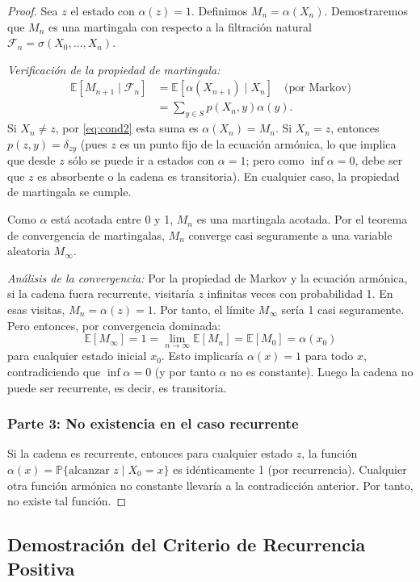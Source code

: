 \documentclass[11pt,a4paper]{article}
\theoremstyle{plain}
\theoremstyle{definition}
\theoremstyle{remark}
\newcommand{\1}{\mathds{1}}
\begin{document}
\begin{proof}
Sea \(z\) el estado con \(\alpha(z) = 1\). Definimos \(M_n = \alpha(X_n)\). Demostraremos que \(M_n\) es una martingala con respecto a la filtración natural \(\mathcal{F}_n = \sigma(X_0, \ldots, X_n)\).

\emph{Verificación de la propiedad de martingala:}
\[
\begin{aligned}
\mathbb{E}[M_{n+1} \mid \mathcal{F}_n] &= \mathbb{E}[\alpha(X_{n+1}) \mid X_n] \quad \text{(por Markov)} \\
&= \sum_{y\in S} p(X_n, y) \alpha(y).
\end{aligned}
\]
Si \(X_n \neq z\), por \eqref{eq:cond2} esta suma es \(\alpha(X_n) = M_n\). Si \(X_n = z\), entonces \(p(z,y) = \delta_{zy}\) (pues \(z\) es un punto fijo de la ecuación armónica, lo que implica que desde \(z\) sólo se puede ir a estados con \(\alpha = 1\); pero como \(\inf \alpha = 0\), debe ser que \(z\) es absorbente o la cadena es transitoria). En cualquier caso, la propiedad de martingala se cumple.

Como \(\alpha\) está acotada entre 0 y 1, \(M_n\) es una martingala acotada. Por el teorema de convergencia de martingalas, \(M_n\) converge casi seguramente a una variable aleatoria \(M_\infty\).

\emph{Análisis de la convergencia:}
Por la propiedad de Markov y la ecuación armónica, si la cadena fuera recurrente, visitaría \(z\) infinitas veces con probabilidad 1. En esas visitas, \(M_n = \alpha(z) = 1\). Por tanto, el límite \(M_\infty\) sería 1 casi seguramente. Pero entonces, por convergencia dominada:
\[
\mathbb{E}[M_\infty] = 1 = \lim_{n\to\infty} \mathbb{E}[M_n] = \mathbb{E}[M_0] = \alpha(x_0)
\]
para cualquier estado inicial \(x_0\). Esto implicaría \(\alpha(x) = 1\) para todo \(x\), contradiciendo que \(\inf \alpha = 0\) (y por tanto \(\alpha\) no es constante). Luego la cadena no puede ser recurrente, es decir, es transitoria.

\subsubsection*{Parte 3: No existencia en el caso recurrente}
Si la cadena es recurrente, entonces para cualquier estado \(z\), la función \(\alpha(x) = \mathbb{P}\{\text{alcanzar } z \mid X_0 = x\}\) es idénticamente 1 (por recurrencia). Cualquier otra función armónica no constante llevaría a la contradicción anterior. Por tanto, no existe tal función.
\end{proof}

\subsection{Demostración del Criterio de Recurrencia Positiva}
\end{document}
